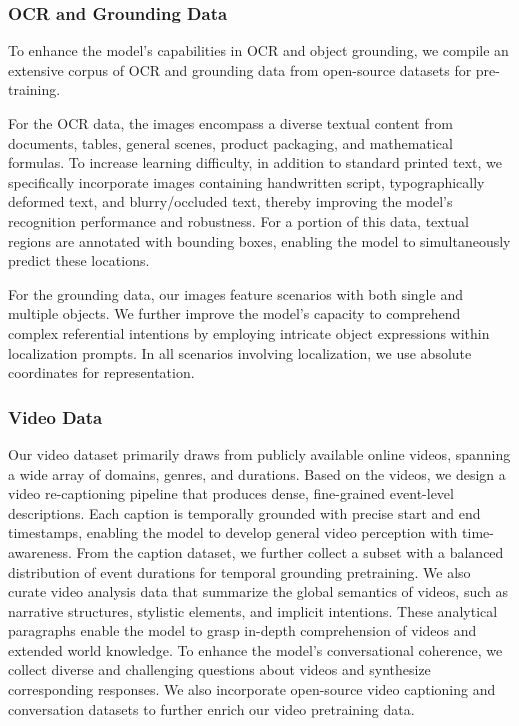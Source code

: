 \subsubsection{OCR and Grounding Data}
To enhance the model's capabilities in OCR and object grounding, we compile an extensive corpus of OCR and grounding data from open-source datasets for pre-training. 

For the OCR data, the images encompass a diverse textual content from documents, tables, general scenes, product packaging, and mathematical formulas. To increase learning difficulty, in addition to standard printed text, we specifically incorporate images containing handwritten script, typographically deformed text, and blurry/occluded text, thereby improving the model's recognition performance and robustness. For a portion of this data, textual regions are annotated with bounding boxes, enabling the model to simultaneously predict these locations. 

For the grounding data, our images feature scenarios with both single and multiple objects. We further improve the model's capacity to comprehend complex referential intentions by employing intricate object expressions within localization prompts. In all scenarios involving localization, we use absolute coordinates for representation.

\subsubsection{Video Data}

Our video dataset primarily draws from publicly available online videos, spanning a wide array of domains, genres, and durations. Based on the videos, we design a video re-captioning pipeline that produces dense, fine-grained event-level descriptions. Each caption is temporally grounded with precise start and end timestamps, enabling the model to develop general video perception with time-awareness. From the caption dataset, we further collect a subset with a balanced distribution of event durations for temporal grounding pretraining. We also curate video analysis data that summarize the global semantics of videos, such as narrative structures, stylistic elements, and implicit intentions. These analytical paragraphs enable the model to grasp in-depth comprehension of videos and extended world knowledge. To enhance the model’s conversational coherence, we collect diverse and challenging questions about videos and synthesize corresponding responses. We also incorporate open-source video captioning and conversation datasets to further enrich our video pretraining data.


